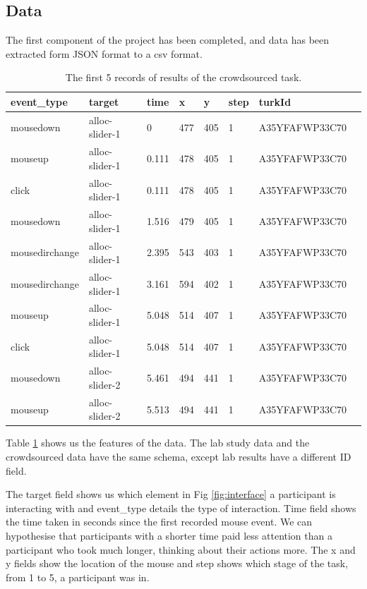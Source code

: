 \documentclass{article}
\begin{document}

\subsection{Data}



The first component of the project has been completed, and data has been extracted form JSON format to a csv format.

\begin{table}[ht]
    \caption{\label{table:data} The first 5 records of results of the crowdsourced task.}

    \begin{tabular}{llllllll}
        \hline
        event\_type    & target         & time  & x   & y   & step & turkId         \\ \hline
        mousedown      & alloc-slider-1 & 0     & 477 & 405 & 1    & A35YFAFWP33C70 \\
        mouseup        & alloc-slider-1 & 0.111 & 478 & 405 & 1    & A35YFAFWP33C70 \\
        click          & alloc-slider-1 & 0.111 & 478 & 405 & 1    & A35YFAFWP33C70 \\
        mousedown      & alloc-slider-1 & 1.516 & 479 & 405 & 1    & A35YFAFWP33C70 \\
        mousedirchange & alloc-slider-1 & 2.395 & 543 & 403 & 1    & A35YFAFWP33C70 \\
        mousedirchange & alloc-slider-1 & 3.161 & 594 & 402 & 1    & A35YFAFWP33C70 \\
        mouseup        & alloc-slider-1 & 5.048 & 514 & 407 & 1    & A35YFAFWP33C70 \\
        click          & alloc-slider-1 & 5.048 & 514 & 407 & 1    & A35YFAFWP33C70 \\
        mousedown      & alloc-slider-2 & 5.461 & 494 & 441 & 1    & A35YFAFWP33C70 \\
        mouseup        & alloc-slider-2 & 5.513 & 494 & 441 & 1    & A35YFAFWP33C70 \\ \hline
    \end{tabular}
\end{table}

Table \ref{table:data} shows us the features of the data.
The lab study data and the crowdsourced data have the same schema, except lab results have a different ID field.

The target field shows us which element in Fig \ref{fig:interface} a participant is interacting with and event\_type details the type of interaction.
Time field shows the time taken in seconds since the first recorded mouse event.
We can hypothesise that participants with a shorter time paid less attention than a participant who took much longer, thinking about their actions more.
The x and y fields show the location of the mouse and step shows which stage of the task, from 1 to 5, a participant was in.
\end{document}
